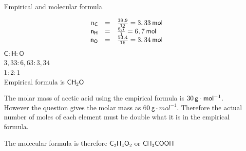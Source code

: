 \begin{wex}{Empirical and molecular formula
      }
{    \begin{equation*}
    \begin{array}{ccc}\hfill {\mathsf{n}}_{\mathsf{C}}& =& \frac{39,9}{12}=3,33\phantom{\rule{2pt}{0ex}}\mathsf{mol}\hfill \\ \hfill {\mathsf{n}}_{\mathsf{H}}& =& \frac{6,7}{1}=6,7\phantom{\rule{2pt}{0ex}}\mathsf{mol}\hfill \\ \hfill {\mathsf{n}}_{\mathsf{O}}& =& \frac{53,4}{16}=3,34\phantom{\rule{2pt}{0ex}}\mathsf{mol}\hfill \end{array}
      \end{equation*}
      \label{m38712*id281812}
$\mathsf{C}:\mathsf{H}:\mathsf{O}$\\
$3,33:6,63:3,34$ \\
$1:2:1$\\
Empirical formula is $\mathsf{CH}{}_{2}\mathsf{O}$\par 
      \label{m38712*id281834}The molar mass of acetic acid using the empirical formula is $30\phantom{\rule{2pt}{0ex}}\mathsf{g}\ensuremath{\cdot}\mathsf{mol}{}^{-1}$. However the question gives the molar mass as $60~\mathsf{g}\cdot{mol}^{-1}$. Therefore the actual number of moles of each element must be double what it is in the empirical formula.\par 
      \label{m38712*id281854}The molecular formula is therefore $\mathsf{C}{}_{2}\mathsf{H}{}_{4}\mathsf{O}{}_{2}$ or $\mathsf{CH}{}_{3}\mathsf{COOH}$\par 
}
    \end{wex}
    \noindent
\par
            \label{m38712*eid672431}\vspace{.5cm} 
      \noindent
